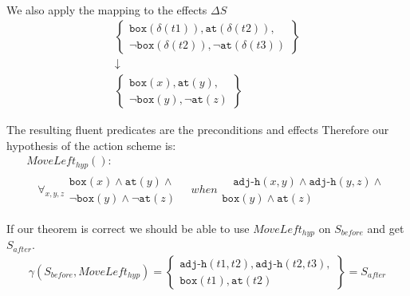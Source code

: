 \documentclass[../Master.tex]{subfiles}
\begin{document}
\begin{thm-sokoban-example-initial-precond}
\begin{equation*}
\begin{gathered}
	\end{gathered}
\end{equation*}
We also apply the mapping to the effects $\Delta S$
\begin{equation*}
	\begin{gathered}
		\left\{
			\begin{gathered}
				\texttt{box}(\delta (t1)), \texttt{at}(\delta (t2)), \\
				\neg\texttt{box}(\delta (t2)), \neg\texttt{at}(\delta (t3))
			\end{gathered}
		\right\} \\
	\downarrow \\
	\left\{
		\begin{gathered}
			\texttt{box}(x), \texttt{at}(y), \\
			\neg\texttt{box}(y), \neg\texttt{at}(z)
		\end{gathered}
	\right\}
	\end{gathered}
\end{equation*}

The resulting fluent predicates are the preconditions and effects 
Therefore our hypothesis of the action scheme is:
\begin{align*}
&MoveLeft_{hyp}():&  \\
&\quad \forall_{x, y, z} 
	\begin{gathered} 
		\texttt{box}(x) \land \texttt{at}(y) \land \\ \neg\texttt{box}(y) \land \neg\texttt{at}(z) \quad 
	\end{gathered}
	when 
	\begin{gathered} 
	\quad \texttt{adj-h}(x, y) \land \texttt{adj-h}(y, z) \land \\ \texttt{box}(y) \land \texttt{at}(z) 
	\end{gathered}&
\end{align*}

If our theorem is correct we should be able to use $MoveLeft_{hyp}$ on $S_{before}$ and get $S_{after}$.
\begin{align*}
&\gamma(S_{before},MoveLeft_{hyp}) = 
	\left\{
		\begin{gathered}
			\texttt{adj-h}(t1, t2), \texttt{adj-h}(t2, t3), \\
			\texttt{box}(t1), \texttt{at}(t2)
		\end{gathered}
	\right\} 
	= S_{after}
&
\end{align*}

\end{thm-sokoban-example-initial-precond}
\end{document}
